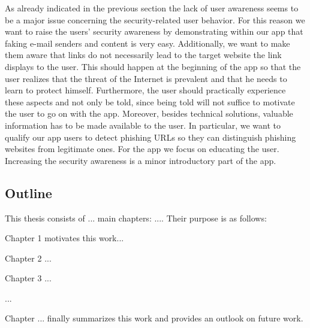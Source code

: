 As already indicated in the previous section the lack of user awareness seems to be a major issue concerning the security-related user behavior. For this reason we want to raise the users' security awareness by demonstrating within our app that faking e-mail senders and content is very easy. Additionally, we want to make them aware that links do not necessarily lead to the target website the link displays to the user. This should happen at the beginning of the app so that the user realizes that the threat of the Internet is prevalent and that he needs to learn to protect himself. Furthermore, the user should practically experience these aspects and not only be told, since being told will not suffice to motivate the user to go on with the app. Moreover, besides technical solutions, valuable information has to be made available to the user. In particular, we want to qualify our app users to detect phishing URLs so they can distinguish phishing websites from legitimate ones. For the app we focus on educating the user. Increasing the security awareness is a minor introductory part of the app.







\subsection{Outline}

This thesis consists of ... main chapters: .... Their purpose is as follows:

Chapter 1 motivates this work...

Chapter 2 ...

Chapter 3 ...

...

Chapter ... finally summarizes this work and provides an outlook on future work.






